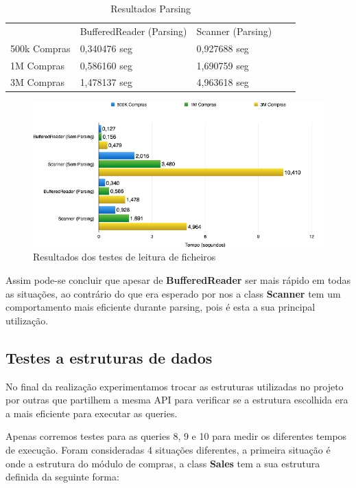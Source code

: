 \documentclass[10pt] {article}
\begin{document}
\begin{table}[h]
\centering
\caption{Resultados Parsing}
\label{my-label}
\begin{tabular}{l|l|l|ll}
\cline{2-3}
                                   & BufferedReader (Parsing) & Scanner (Parsing) &  &  \\ \cline{1-3}
\multicolumn{1}{|l|}{500k Compras} & 0,340476 seg             & 0,927688 seg      &  &  \\ \cline{1-3}
\multicolumn{1}{|l|}{1M Compras}   & 0,586160 seg             & 1,690759 seg      &  &  \\ \cline{1-3}
\multicolumn{1}{|l|}{3M Compras}   & 1,478137 seg             & 4,963618 seg      &  &  \\ \cline{1-3}
\end{tabular}
\end{table}

\begin{figure}[ht!]
\centering
\includegraphics[width=150mm]{filegraph.png}
\caption{Resultados dos testes de leitura de ficheiros}
\label{fig:sales}
\end{figure}

\newpage

\par Assim pode-se concluir que apesar de  \color{blue} \textbf{BufferedReader} \color{black} ser mais rápido em todas as 
situações, ao contrário do que era esperado por nos a class  \color{blue} \textbf{Scanner} \color{black} tem um comportamento 
mais eficiente durante parsing, pois é esta a sua principal utilização.

\subsection{Testes a estruturas de dados}
\par No final da realização experimentamos trocar as estruturas utilizadas no projeto por outras que partilhem a mesma API 
para verificar se a estrutura escolhida era a mais eficiente para executar as queries.
\par Apenas corremos testes para as queries 8, 9 e 10 para medir os diferentes tempos de execução. 
Foram consideradas 4 situações diferentes, a primeira situação é onde a estrutura do módulo de
compras, a class \color{blue} \textbf{Sales} \color{black} tem a sua estrutura definida da seguinte forma:
\end{document}

